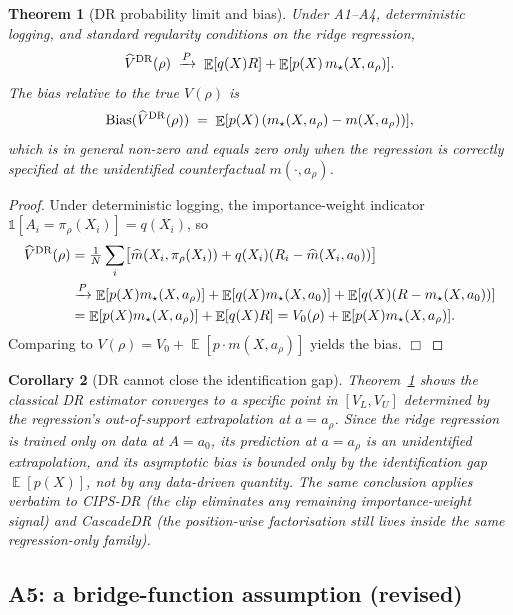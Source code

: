 \documentclass[11pt]{article}
\newtheorem{theorem}{Theorem}
\newtheorem{corollary}[theorem]{Corollary}
\DeclareMathOperator{\E}{\mathbb{E}}
\begin{document}
\begin{theorem}[DR probability limit and bias]
\label{thm:dr-bias}
Under A1--A4, deterministic logging, and standard regularity conditions on
the ridge regression,
\begin{equation}
\widehat V^{\rm DR}(\rho) \;\xrightarrow{P}\; \E[q(X) R] + \E[p(X)\, m_\star(X, a_\rho)].
\label{eq:dr-limit}
\end{equation}
The bias relative to the true $V(\rho)$ is
\begin{equation}
\mathrm{Bias}(\widehat V^{\rm DR}(\rho)) \;=\; \E[p(X) \,(m_\star(X, a_\rho) - m(X, a_\rho))],
\label{eq:dr-bias}
\end{equation}
which is in general non-zero and equals zero only when the regression
is correctly specified at the unidentified counterfactual $m(\cdot, a_\rho)$.
\end{theorem}
\begin{proof}
Under deterministic logging, the importance-weight indicator
$\mathbb{1}[A_i = \pi_\rho(X_i)] = q(X_i)$, so
\begin{align*}
\widehat V^{\rm DR}(\rho)
&= \tfrac{1}{N}\sum_i \bigl[\widehat m(X_i, \pi_\rho(X_i)) + q(X_i) (R_i - \widehat m(X_i, a_0))\bigr] \\
&\xrightarrow{P} \E[p(X) m_\star(X, a_\rho)] + \E[q(X) m_\star(X, a_0)] + \E[q(X)(R - m_\star(X, a_0))] \\
&= \E[p(X) m_\star(X, a_\rho)] + \E[q(X) R] = V_0(\rho) + \E[p(X) m_\star(X, a_\rho)].
\end{align*}
Comparing to $V(\rho) = V_0 + \E[p \cdot m(X, a_\rho)]$ yields the bias. $\Box$
\end{proof}

\begin{corollary}[DR cannot close the identification gap]
Theorem~\ref{thm:dr-bias} shows the classical DR estimator converges to
a specific point in $[V_L, V_U]$ determined by the regression's
\emph{out-of-support extrapolation} at $a = a_\rho$.  Since the ridge
regression is trained only on data at $A = a_0$, its prediction at
$a = a_\rho$ is an unidentified extrapolation, and its asymptotic bias is
bounded only by the identification gap $\E[p(X)]$, not by any data-driven
quantity.  The same conclusion applies verbatim to CIPS-DR (the clip
eliminates any remaining importance-weight signal) and CascadeDR (the
position-wise factorisation still lives inside the same regression-only
family).
\end{corollary}

\subsection{A5: a bridge-function assumption (revised)}
\label{sec:a5-revised}
\end{document}
